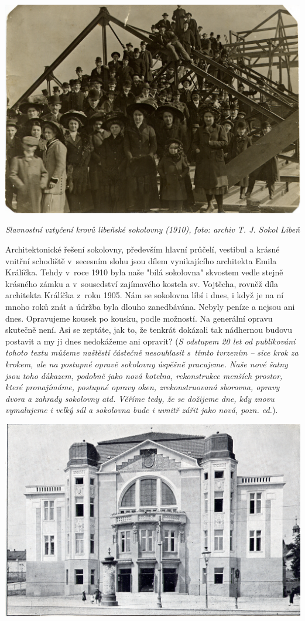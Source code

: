 \documentclass[a5paper, 11pt, twoside]{article}
\begin{document}
 \includegraphics[width=\textwidth]{img/18_krovy_sokolovny.jpg}

\textit{Slavnostní vztyčení krovů libeňské sokolovny (1910), foto: archiv
T. J. Sokol Libeň}

Architektonické řešení sokolovny, především hlavní průčelí, vestibul a
krásné vnitřní schodiště v~secesním slohu jsou dílem vynikajícího
architekta Emila Králíčka. Tehdy v~roce 1910 byla naše "bílá sokolovna"
skvostem vedle stejně krásného zámku a v~sousedství zajímavého kostela
sv. Vojtěcha, rovněž díla architekta Králíčka z~roku 1905. Nám se
sokolovna líbí i dnes, i když je na ní mnoho roků znát a údržba byla
dlouho zanedbávána. Nebyly peníze a nejsou ani dnes. Opravujeme kousek
po kousku, podle možností. Na generální opravu skutečně není. Asi se
zeptáte, jak to, že tenkrát dokázali tak nádhernou budovu postavit a my
ji dnes nedokážeme ani opravit? (\textit{S odstupem 20 let od publikování
tohoto textu můžeme naštěstí částečně nesouhlasit s~tímto tvrzením --
sice krok za krokem, ale na postupné opravě sokolovny úspěšně pracujeme.
Naše nové šatny jsou toho důkazem, podobně jako nová kotelna,
rekonstrukce menších prostor, které pronajímáme, postupné opravy oken,
zrekonstruovaná sborovna, opravy dvora a zahrady sokolovny atd. Věříme
tedy, že se dožijeme dne, kdy znovu vymalujeme i velký sál a sokolovna
bude i uvnitř zářit jako nová, pozn. ed.}).

 \includegraphics[width=\textwidth]{img/19_sokolovna_dokoncena.jpg}
\end{document}
